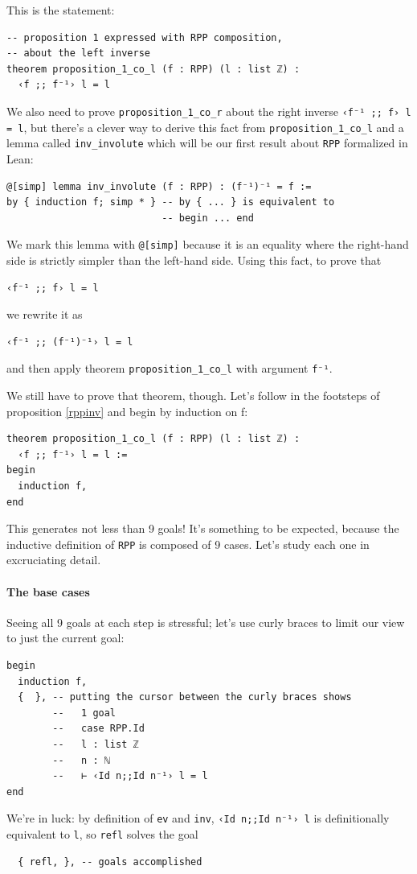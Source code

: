 \documentclass{book}
\theoremstyle{definition}
\theoremstyle{remark}
\theoremstyle{plain}
\begin{document}
This is the statement:
\begin{lstlisting}
-- proposition 1 expressed with RPP composition,
-- about the left inverse
theorem proposition_1_co_l (f : RPP) (l : list ℤ) :
  ‹f ;; f⁻¹› l = l
\end{lstlisting}
We also need to prove \lstinline{proposition_1_co_r} about the right inverse \lstinline{‹f⁻¹ ;; f› l = l},
but there's a clever way to derive this fact from \lstinline{proposition_1_co_l}
and a lemma called \lstinline{inv_involute} which will be our first result about \lstinline{RPP} formalized in Lean:
\begin{lstlisting}
@[simp] lemma inv_involute (f : RPP) : (f⁻¹)⁻¹ = f :=
by { induction f; simp * } -- by { ... } is equivalent to
                           -- begin ... end
\end{lstlisting}
We mark this lemma with \lstinline{@[simp]} because it is an equality where the right-hand side is strictly simpler than the left-hand side.
Using this fact, to prove that
\begin{lstlisting}
‹f⁻¹ ;; f› l = l
\end{lstlisting}
we rewrite it as
\begin{lstlisting}
‹f⁻¹ ;; (f⁻¹)⁻¹› l = l
\end{lstlisting}
and then apply theorem \lstinline{proposition_1_co_l} with argument \lstinline{f⁻¹}.

We still have to prove that theorem, though.
Let's follow in the footsteps of proposition \ref{rppinv} and begin by induction on f:
\begin{lstlisting}
theorem proposition_1_co_l (f : RPP) (l : list ℤ) :
  ‹f ;; f⁻¹› l = l :=
begin
  induction f,
end
\end{lstlisting}
This generates not less than 9 goals!
It's something to be expected, because the inductive definition of \lstinline{RPP} is composed of 9 cases.
Let's study each one in excruciating detail.

\paragraph{The base cases}

Seeing all 9 goals at each step is stressful;
let's use curly braces to limit our view to just the current goal:
\begin{lstlisting}
begin
  induction f,
  {  }, -- putting the cursor between the curly braces shows
        --   1 goal
        --   case RPP.Id
        --   l : list ℤ
        --   n : ℕ
        --   ⊢ ‹Id n;;Id n⁻¹› l = l
end
\end{lstlisting}
We're in luck: by definition of \lstinline{ev} and \lstinline{inv},
\lstinline{‹Id n;;Id n⁻¹› l} is definitionally equivalent to \lstinline{l},
so \lstinline{refl} solves the goal
\begin{lstlisting}
  { refl, }, -- goals accomplished
\end{lstlisting}
\end{document}
